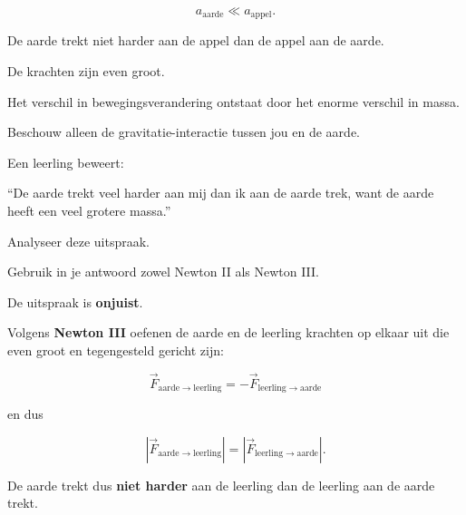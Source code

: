 \documentclass{ximera}
\begin{document}
\[
a_\mathrm{aarde}
\ll
a_\mathrm{appel}.
\]


\begin{opmerking}

De aarde trekt niet harder aan de appel dan de appel aan de aarde.

De krachten zijn even groot.

Het verschil in bewegingsverandering ontstaat door het enorme verschil
in massa.

\end{opmerking}


\begin{oefening}{\oefU\ESS}

Beschouw alleen de gravitatie-interactie tussen jou en de aarde.

Een leerling beweert:

\begin{center}
``De aarde trekt veel harder aan mij dan ik aan de aarde trek,
want de aarde heeft een veel grotere massa.''
\end{center}

Analyseer deze uitspraak.

Gebruik in je antwoord zowel Newton II als Newton III.

\begin{oplossing}

      De uitspraak is \textbf{onjuist}.
      
      Volgens \textbf{Newton III} oefenen de aarde en de leerling krachten
      op elkaar uit die even groot en tegengesteld gericht zijn:
      
      \[
      \boxed{
      \vec F_{\mathrm{aarde\to leerling}}
      =
      -\vec F_{\mathrm{leerling\to aarde}}
      }
      \]
      
      en dus
      
      \[
      \left|\vec F_{\mathrm{aarde\to leerling}}\right|
      =
      \left|\vec F_{\mathrm{leerling\to aarde}}\right|.
      \]
      
      De aarde trekt dus \textbf{niet harder} aan de leerling dan de
      leerling aan de aarde trekt.
      
      \begin{center}
\end{center}
\end{oplossing}
\end{oefening}
\end{document}
